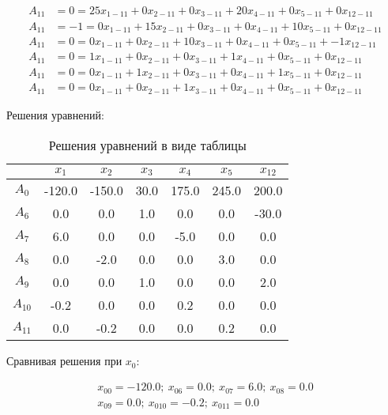 \vspace{-\baselineskip}\begin{align*}
	A_{11} &= 0 = 25x_{1-11} + 0x_{2-11} + 0x_{3-11} + 20x_{4-11} + 0x_{5-11} + 0x_{12-11} \\ 
	A_{11} &= -1 = 0x_{1-11} + 15x_{2-11} + 0x_{3-11} + 0x_{4-11} + 10x_{5-11} + 0x_{12-11} \\ 
	A_{11} &= 0 = 0x_{1-11} + 0x_{2-11} + 10x_{3-11} + 0x_{4-11} + 0x_{5-11} + -1x_{12-11} \\ 
	A_{11} &= 0 = 1x_{1-11} + 0x_{2-11} + 0x_{3-11} + 1x_{4-11} + 0x_{5-11} + 0x_{12-11} \\ 
	A_{11} &= 0 = 0x_{1-11} + 1x_{2-11} + 0x_{3-11} + 0x_{4-11} + 1x_{5-11} + 0x_{12-11} \\ 
	A_{11} &= 0 = 0x_{1-11} + 0x_{2-11} + 1x_{3-11} + 0x_{4-11} + 0x_{5-11} + 0x_{12-11}
\end{align*}

\normalsize

Решения уравнений:

\begin{table}[H]
	\centering
	\normalsize
	\caption{Решения уравнений в виде таблицы}
	\label{tbl:1}
	\begin{tabular}{|c|c|c|c|c|c|c|}
		\hline
		&$x_{1}$&$x_{2}$&$x_{3}$&$x_{4}$&$x_{5}$&$x_{12}$\\ \hline
		$A_{0}$&-120.0&-150.0&30.0&175.0&245.0&200.0\\ \hline
		$A_{6}$&0.0&0.0&1.0&0.0&0.0&-30.0\\ \hline
		$A_{7}$&6.0&0.0&0.0&-5.0&0.0&0.0\\ \hline
		$A_{8}$&0.0&-2.0&0.0&0.0&3.0&0.0\\ \hline
		$A_{9}$&0.0&0.0&1.0&0.0&0.0&2.0\\ \hline
		$A_{10}$&-0.2&0.0&0.0&0.2&0.0&0.0\\ \hline
		$A_{11}$&0.0&-0.2&0.0&0.0&0.2&0.0\\ \hline

\end{tabular}

\end{table}

Сравнивая решения при $x_0$:

\vspace{-\baselineskip}\begin{align*}
	x_{00} = -120.0;\ x_{06} = 0.0;\ x_{07} = 6.0;\ x_{08} = 0.0\\ 
	x_{09} = 0.0;\ x_{010} = -0.2;\ x_{011} = 0.0\\
\end{align*}

